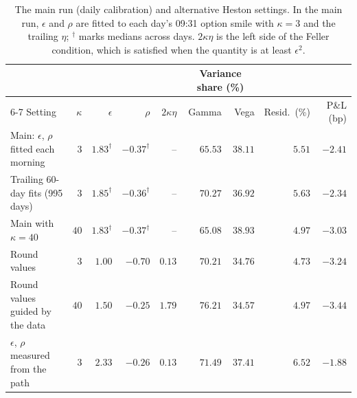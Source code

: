 \begin{table}[tbp]
\centering
\footnotesize
\setlength{\tabcolsep}{4pt}
\begin{tabular}{lrrrrrrrr}
\toprule
 & & & & & \multicolumn{2}{c}{Variance share (\%)} & & \\
\cmidrule(lr){6-7}
Setting & $\kappa$ & $\epsilon$ & $\rho$ & $2\kappa\eta$ & Gamma & Vega & Resid.\ (\%) & P\&L (bp) \\
\midrule
Main: $\epsilon$, $\rho$ fitted each morning & $3$ & $1.83^{\dagger}$ & $-0.37^{\dagger}$ & -- & $65.53$ & $38.11$ & $5.51$ & $-2.41$ \\
Trailing 60-day fits (995 days) & $3$ & $1.85^{\dagger}$ & $-0.36^{\dagger}$ & -- & $70.27$ & $36.92$ & $5.63$ & $-2.34$ \\
Main with $\kappa = 40$ & $40$ & $1.83^{\dagger}$ & $-0.37^{\dagger}$ & -- & $65.08$ & $38.93$ & $4.97$ & $-3.03$ \\
Round values & $3$ & $1.00$ & $-0.70$ & $0.13$ & $70.21$ & $34.76$ & $4.73$ & $-3.24$ \\
Round values guided by the data & $40$ & $1.50$ & $-0.25$ & $1.79$ & $76.21$ & $34.57$ & $4.97$ & $-3.44$ \\
$\epsilon$, $\rho$ measured from the path & $3$ & $2.33$ & $-0.26$ & $0.13$ & $71.49$ & $37.41$ & $6.52$ & $-1.88$ \\
\bottomrule
\end{tabular}
\caption{The main run (daily calibration) and alternative Heston settings. In the main run, $\epsilon$ and $\rho$ are fitted to each day's 09:31 option smile with $\kappa = 3$ and the trailing $\eta$; $^{\dagger}$ marks medians across days. $2\kappa\eta$ is the left side of the Feller condition, which is satisfied when the quantity is at least $\epsilon^2$.}
\label{tab:params}
\end{table}
